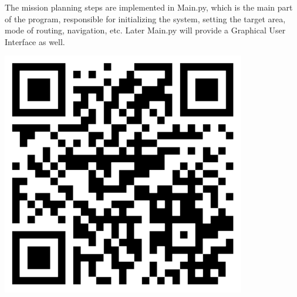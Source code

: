 \begin{tcolorbox}[colback=cyan!5,colframe=cyan!40!black,title=Code: Main.py \\ https://www.dropbox.com/s/h1067ywmdajkegk/Main.py]
\begin{minipage}{0,6\textwidth}
The mission planning steps are implemented in Main.py, which is the main part of the program, responsible for initializing the system, setting the target area, mode of routing, navigation, etc. Later Main.py will provide a Graphical User Interface as well.
\end{minipage}
\begin{minipage}{0,35\textwidth}
\raggedleft
\includegraphics[width=0.8\textwidth]{img/main}
\end{minipage}

\end{tcolorbox}

